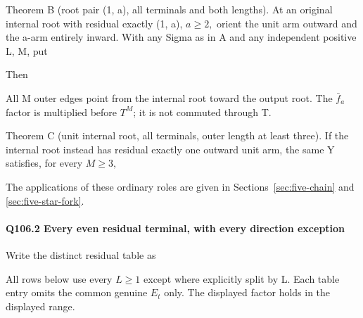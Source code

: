 Theorem B (root pair (1, a), all terminals and both lengths). At an
original internal root with residual exactly (1, a), \(a\ge 2,\allowbreak \) orient the unit
arm outward and the a-arm entirely inward. With any Sigma as in A and
any independent positive L, M, put


Then


All M outer edges point from the internal root toward the output root.
The \(\bar f_a\) factor is multiplied before \(T^M\); it is not commuted through T.

Theorem C (unit internal root, all terminals, outer length at least three).
If the internal root instead has residual exactly one outward unit arm,
the same Y satisfies, for every \(M\ge 3,\allowbreak \)


The applications of these ordinary roles are given in Sections~\ref{sec:five-chain} and \ref{sec:five-star-fork}.

\paragraph{Q106.2 Every even residual terminal, with every direction exception}

Write the distinct residual table as


All rows below use every \(L\ge 1\) except where explicitly split by L. Each
table entry omits the common genuine \(E_t\) only. The displayed factor holds in the displayed range.


